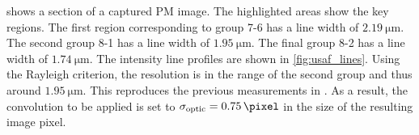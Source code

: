 % 
 shows a section of a captured PM image.
The highlighted areas show the key regions.
The first region corresponding to group \textrm{7-6} \raisebox{.25em}{\tikz \draw[magenta,ultra thick,dashed](0,0)--(0.25,0);} has a line width of $\SI{2.19}{\micro\meter}$.
The second group \textrm{8-1} \raisebox{.25em}{\tikz \draw[yellow,ultra thick,dashed](0,0)--(0.25,0);} has a line width of $\SI{1.95}{\micro\meter}$.
The final group \textrm{8-2} \raisebox{.25em}{\tikz \draw[cyan,ultra thick,dashed](0,0)--(0.25,0);} has a line width of $\SI{1.74}{\micro\meter}$.
The intensity line profiles are shown in \cref{fig:usaf_lines}.
% 
Using the Rayleigh criterion, the resolution is in the range of the second group and thus around $\SI{1.95}{\micro\meter}$.
This reproduces the previous measurements in \cite{menzel_finite-difference_2018} .
As a result, the convolution to be applied is set to $\opticsigma = \SI{0.75}{\pixel}$ in the size of the resulting image pixel.
% 
% 
% 
